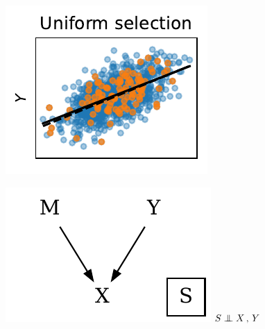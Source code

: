 \documentclass[a4paper,num-refs]{oup-contemporary}
\newcommand\indep{\protect\mathpalette{\protect\independenT}{\perp}}
\def\independenT#1#2{\mathrel{\rlap{$#1#2$}\mkern3.5mu{#1#2}}}
\begin{document}
%
\begin{figure}
  \begin{minipage}{.3\textwidth}
  \begin{minipage}{\textwidth}
  \begin{minipage}{.57\textwidth}
    \includegraphics[width=\textwidth]{figures/simulations/selecting_on_parent_or_child/selection_bias_1.pdf}
  \end{minipage}%
  \begin{minipage}{.42\textwidth}
    \includegraphics[width=\textwidth]{figures/graphs/sample_selection_bias_1.pdf}
    \centering
    \(S \indep X\,,\,Y\)
  \end{minipage}%
  \end{minipage}%


\end{minipage}
\end{figure}
\end{document}
